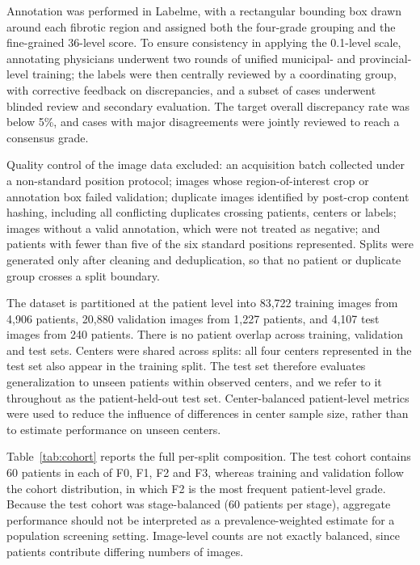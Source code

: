 Annotation was performed in Labelme, with a rectangular bounding box drawn
around each fibrotic region and assigned both the four-grade grouping and the
fine-grained 36-level score. To ensure consistency in applying the 0.1-level
scale, annotating physicians underwent two rounds of unified municipal- and
provincial-level training; the labels were then centrally reviewed by a
coordinating group, with corrective feedback on discrepancies, and a subset of
cases underwent blinded review and secondary evaluation. The target overall
discrepancy rate was below 5\%, and cases with major disagreements were jointly
reviewed to reach a consensus grade.

Quality control of the image data excluded: an acquisition batch collected
under a non-standard position protocol; images whose region-of-interest crop
or annotation box failed validation; duplicate images identified by post-crop
content hashing, including all conflicting duplicates crossing patients,
centers or labels; images without a valid annotation, which were not treated
as negative; and patients with fewer than five of the six standard positions
represented. Splits were generated only after cleaning and deduplication, so
that no patient or duplicate group crosses a split boundary.

The dataset is partitioned at the patient level into 83,722 training images
from 4,906 patients, 20,880 validation images from 1,227 patients, and 4,107
test images from 240 patients. There is no patient overlap across training,
validation and test sets. Centers were shared across splits: all four centers
represented in the test set also appear in the training split. The test set
therefore evaluates generalization to unseen patients within observed centers,
and we refer to it throughout as the patient-held-out test set. Center-balanced
patient-level metrics were used to reduce the influence of differences in center
sample size, rather than to estimate performance on unseen centers.

Table~\ref{tab:cohort} reports the full per-split composition. The test cohort
contains 60 patients in each of F0, F1, F2 and F3, whereas training and
validation follow the cohort distribution, in which F2 is the most frequent
patient-level grade. Because the test cohort was stage-balanced (60 patients per
stage), aggregate performance should not be interpreted as a prevalence-weighted
estimate for a population screening setting. Image-level counts are not exactly
balanced, since patients contribute differing numbers of images.

